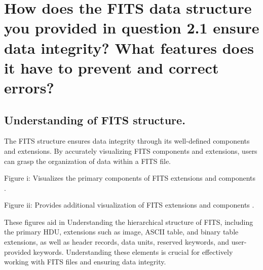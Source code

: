 \documentclass[a4paper,oneside,11pt]{book}
\begin{document}
\section{How does the FITS data structure you provided in question 2.1 ensure data integrity? What features does it have to prevent and correct errors?}
\subsection{Understanding of FITS structure.}
The FITS structure ensures data integrity through its well-defined components and extensions. By accurately visualizing FITS components and extensions, users can grasp the organization of data within a FITS file.

Figure i: Visualizes the primary components of FITS extensions and components \citep{fits_3}.

Figure ii: Provides additional visualization of FITS extensions and components \citep{fits_3}.

These figures aid in Understanding the hierarchical structure of FITS, including the primary HDU, extensions such as image, ASCII table, and binary table extensions, as well as header records, data units, reserved keywords, and user-provided keywords. Understanding these elements is crucial for effectively working with FITS files and ensuring data integrity.
\end{document}
